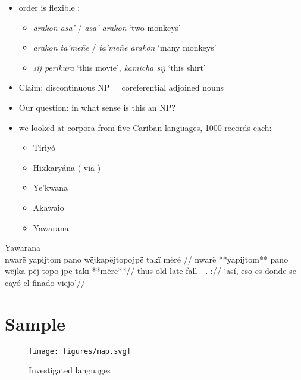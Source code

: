 \documentclass[10pt]{article}
\begin{document}
\begin{itemize}
\tightlist
\item
  order is flexible \parencites[128]{payne1993nonconfigurationality}:

  \begin{itemize}
  \tightlist
  \item
    \emph{arakon asa'} / \emph{asa' arakon} `two monkeys'
  \item
    \emph{arakon ta'meñe} / \emph{ta'meñe arakon} `many monkeys'
  \item
    \emph{sïj perikura} `this movie', \emph{kamicha sïj} `this shirt'
  \end{itemize}
\item
  Claim: discontinuous NP = coreferential adjoined nouns 
\item
  Our question: in what sense is this an NP? 
\item
  we looked at corpora from five Cariban languages, 1000 records each:

  \begin{itemize}
  \tightlist
  \item
    Tiriyó \parencites{meiraDBtrio}
  \item
    Hixkaryána (\textcites{derbyshire1965textos} via
    \textcites{meiraDBhixka})
  \item
    Ye'kwana \parencites{caceresDByekwana}
  \item
    Akawaio \parencites{caesarDBakawaio}
  \item
    Yawarana \parencites{caceres2020flex}
  \end{itemize}
\end{itemize}

\ex Yawarana \parencite{caceres2020flex} \\
\label{conv1stenc-33}    \begingl
    \glpreamble nwarë yapijtom pano wëjkapëjtopojpë takï mërë //
    \gla nwarë **yapijtom** pano wëjka-pëj-topo-jpë takï **mërë**//
    \glb thus old late fall---.  ://
        \glft ‘así, eso es donde se cayó el finado viejo’//  
    \endgl 
\xe


\section{Sample}

\begin{figure}
\centering
\texttt{[image: figures/map.svg]}
\caption{Investigated languages}
\end{figure}
\end{document}
